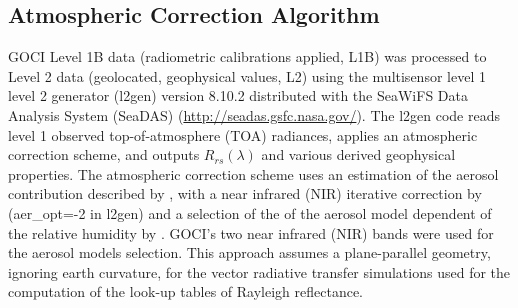 \documentclass[onecolumn,3p,letterpaper,11pt]{elsarticle}
\begin{document}
\subsection{Atmospheric Correction Algorithm}
GOCI Level 1B data (radiometric calibrations applied, L1B) was processed to Level 2 data (geolocated, geophysical values, L2) using the multisensor level 1 level 2 generator (l2gen) version 8.10.2 distributed with the SeaWiFS Data Analysis System (SeaDAS) (\url{http://seadas.gsfc.nasa.gov/}). The l2gen code reads level 1 observed top-of-atmosphere (TOA) radiances, applies an atmospheric correction scheme, and outputs $R_{rs}(\lambda)$ and various derived geophysical properties. The atmospheric correction scheme uses an estimation of the aerosol contribution described by \citet{Gordon1994}, with a near infrared (NIR) iterative correction by \citet{Bailey2010} ({\ttfamily aer\_opt=-2} in l2gen) and a selection of the of the aerosol model dependent of the relative humidity by \citet{Ahmad2010}. GOCI's two near infrared (NIR) bands were used for the aerosol models selection. This approach assumes a plane-parallel geometry, ignoring earth curvature, for the vector radiative transfer simulations used for the computation of the { look-up tables of Rayleigh reflectance}. 
\end{document}
